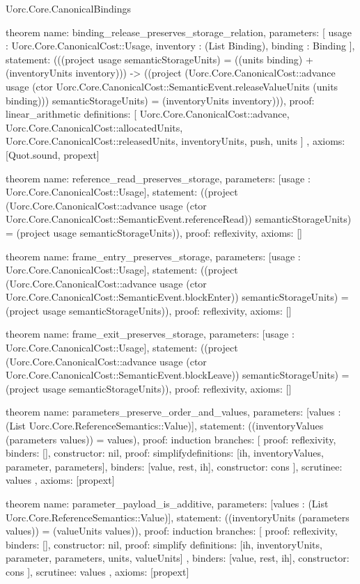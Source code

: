 \begin{lexlean}{Uorc.Core.CanonicalBindings}
\begin{semanticmodule}
theorem{
  name: binding_release_preserves_storage_relation,
  parameters: [
    usage : Uorc.Core.CanonicalCost::Usage,
    inventory : (List Binding),
    binding : Binding
  ],
  statement: (((project usage semanticStorageUnits) = ((units binding) + (inventoryUnits inventory))) -> ((project (Uorc.Core.CanonicalCost::advance usage (ctor Uorc.Core.CanonicalCost::SemanticEvent.releaseValueUnits (units binding))) semanticStorageUnits) = (inventoryUnits inventory))),
  proof: linear_arithmetic{
    definitions: [
      Uorc.Core.CanonicalCost::advance,
      Uorc.Core.CanonicalCost::allocatedUnits,
      Uorc.Core.CanonicalCost::releasedUnits,
      inventoryUnits,
      push,
      units
    ]
  },
  axioms: [Quot.sound, propext]
}

theorem{
  name: reference_read_preserves_storage,
  parameters: [usage : Uorc.Core.CanonicalCost::Usage],
  statement: ((project (Uorc.Core.CanonicalCost::advance usage (ctor Uorc.Core.CanonicalCost::SemanticEvent.referenceRead)) semanticStorageUnits) = (project usage semanticStorageUnits)),
  proof: reflexivity{},
  axioms: []
}

theorem{
  name: frame_entry_preserves_storage,
  parameters: [usage : Uorc.Core.CanonicalCost::Usage],
  statement: ((project (Uorc.Core.CanonicalCost::advance usage (ctor Uorc.Core.CanonicalCost::SemanticEvent.blockEnter)) semanticStorageUnits) = (project usage semanticStorageUnits)),
  proof: reflexivity{},
  axioms: []
}

theorem{
  name: frame_exit_preserves_storage,
  parameters: [usage : Uorc.Core.CanonicalCost::Usage],
  statement: ((project (Uorc.Core.CanonicalCost::advance usage (ctor Uorc.Core.CanonicalCost::SemanticEvent.blockLeave)) semanticStorageUnits) = (project usage semanticStorageUnits)),
  proof: reflexivity{},
  axioms: []
}

theorem{
  name: parameters_preserve_order_and_values,
  parameters: [values : (List Uorc.Core.ReferenceSemantics::Value)],
  statement: ((inventoryValues (parameters values)) = values),
  proof: induction{
    branches: [
      {proof: reflexivity{}, binders: [], constructor: nil},
      {
        proof: simplify{definitions: [ih, inventoryValues, parameter, parameters]},
        binders: [value, rest, ih],
        constructor: cons
      }
    ],
    scrutinee: values
  },
  axioms: [propext]
}

theorem{
  name: parameter_payload_is_additive,
  parameters: [values : (List Uorc.Core.ReferenceSemantics::Value)],
  statement: ((inventoryUnits (parameters values)) = (valueUnits values)),
  proof: induction{
    branches: [
      {proof: reflexivity{}, binders: [], constructor: nil},
      {
        proof: simplify{
          definitions: [ih, inventoryUnits, parameter, parameters, units, valueUnits]
        },
        binders: [value, rest, ih],
        constructor: cons
      }
    ],
    scrutinee: values
  },
  axioms: [propext]
}


\end{semanticmodule}
\end{lexlean}

